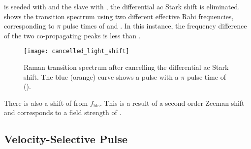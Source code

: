 is seeded with  and the slave with
, the differential ac Stark shift is eliminated.
 shows the transition spectrum using two different effective Rabi
frequencies, corresponding to \(\pi\) pulse times of
 and
. In this instance, the frequency difference of the two
co-propagating peaks is less than .
\begin{figure}[htpb!]
  \centering
  \texttt{[image: cancelled\_light\_shift]}
  \caption[Raman transition spectrum after cancelling the differential
  ac Stark shift.]{Raman transition spectrum after cancelling the differential
    ac Stark shift. The blue (orange) curve shows a pulse with a \(\pi\) pulse
  time of 
().}
  \label{fig:cancelled_light_shift}
\end{figure}
There is also a shift of  from
\(f_\text{hfs}\).
This is a result of a
second-order Zeeman shift and corresponds to a field strength of
.
\subsection{Velocity-Selective Pulse}\label{subsec:vel_select}

